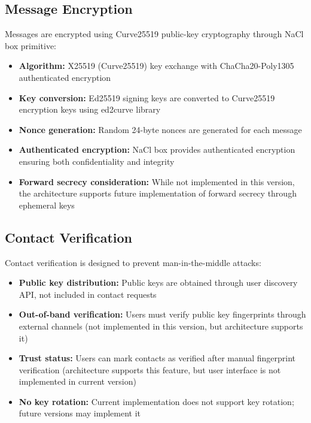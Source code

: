 \documentclass[12pt,a4paper,openany]{book}
\begin{document}
\subsection{Message Encryption}

Messages are encrypted using Curve25519 public-key cryptography through NaCl box primitive:

\begin{itemize}
\item \textbf{Algorithm:} X25519 (Curve25519) key exchange with ChaCha20-Poly1305 authenticated encryption
\item \textbf{Key conversion:} Ed25519 signing keys are converted to Curve25519 encryption keys using ed2curve library
\item \textbf{Nonce generation:} Random 24-byte nonces are generated for each message
\item \textbf{Authenticated encryption:} NaCl box provides authenticated encryption ensuring both confidentiality and integrity
\item \textbf{Forward secrecy consideration:} While not implemented in this version, the architecture supports future implementation of forward secrecy \cite{e2ee-messaging} through ephemeral keys
\end{itemize}

\subsection{Contact Verification}

Contact verification is designed to prevent man-in-the-middle attacks:

\begin{itemize}
\item \textbf{Public key distribution:} Public keys are obtained through user discovery API, not included in contact requests
\item \textbf{Out-of-band verification:} Users must verify public key fingerprints through external channels (not implemented in this version, but architecture supports it)
\item \textbf{Trust status:} Users can mark contacts as verified after manual fingerprint verification (architecture supports this feature, but user interface is not implemented in current version)
\item \textbf{No key rotation:} Current implementation does not support key rotation; future versions may implement it
\end{itemize}
\end{document}
